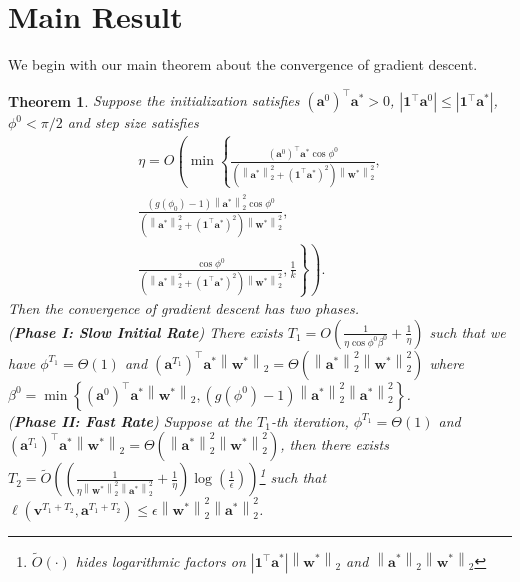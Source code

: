 \documentclass{article}
\newcommand{\firstlayer}{w}
\newcommand{\firstlayerWN}{v}
\newcommand{\secondlayer}{a}
\newcommand{\vect}[1]{\mathbf{#1}}
\newcommand{\norm}[1]{\left\|#1\right\|}
\newcommand{\abs}[1]{\left|#1\right|}
\newtheorem{thm}{Theorem}[section]
\begin{document}
\section{Main Result}
\label{sec:converge}
We begin with our main theorem about the convergence of gradient descent.
\begin{thm}\label{thm:w_norm_1_gd_converge}
Suppose the initialization satisfies $\left(\vect{\secondlayer}^0\right)^\top \vect{\secondlayer}^* > 0$, $\abs{ \vect{1}^\top\vect{\secondlayer}^0}\le \abs{\vect{1}^\top \vect{\secondlayer}^*}$, $\phi^0 <\pi/2$ and
step size satisfies \begin{align*}
\eta = O\left( \min\left\{\frac{\left(\vect{\secondlayer}^0\right)^\top \vect{\secondlayer}^*\cos \phi^0}{\left(\norm{\vect{\secondlayer}^*}_2^2+\left(\vect{1}^\top\vect{\secondlayer}^*\right)^2\right)\norm{\vect{\firstlayer}^*}_2^2},\right.\right.\\
\left.\left.\frac{\left(g(\phi_0)-1\right)\norm{\vect{\secondlayer}^*}_2^2\cos \phi^0}{\left(\norm{\vect{\secondlayer}^*}_2^2+\left(\vect{1}^\top\vect{\secondlayer}^*\right)^2\right)\norm{\vect{\firstlayer}^*}_2^2},\right.\right.\\
\left.\left.\frac{\cos \phi^0}{\left(\norm{\vect{\secondlayer}^*}_2^2+\left(\vect{1}^\top\vect{\secondlayer}^*\right)^2\right)\norm{\vect{\firstlayer}^*}_2^2},
\frac{1}{k}\right\}\right).
\end{align*}
Then the convergence of gradient descent has two phases.\\
(\textbf{Phase I: Slow Initial Rate})
There exists $T_1 = O\left(\frac{1}{\eta\cos\phi^0\beta^0}+ \frac{1}{\eta}\right)$ such that  we have
$\phi^{T_1} = \Theta\left(1\right)$ and $\left(\vect{\secondlayer}^{T_1}\right)^\top \vect{\secondlayer}^*\norm{\vect{\firstlayer}^*}_2 = \Theta\left(\norm{\vect{\secondlayer}^*}_2^2\norm{\vect{\firstlayer}^*}_2^2\right)$ where $\beta^0 = \min\left\{\left(\vect{\secondlayer}^0\right)^\top \vect{\secondlayer}^*\norm{\vect{\firstlayer}^*}_2, (g(\phi^0)-1)\norm{\vect{\secondlayer}^*}_2^2\norm{\vect{\secondlayer}^*}_2^2\right\}$. \\
(\textbf{Phase II: Fast Rate})
Suppose at the $T_1$-th iteration, $\phi^{T_1} = \Theta\left(1\right)$ and $\left(\vect{\secondlayer}^{T_1}\right)^\top \vect{\secondlayer}^*\norm{\vect{\firstlayer}^*}_2 = \Theta\left(\norm{\vect{\secondlayer}^*}_2^2\norm{\vect{\firstlayer}^*}_2^2\right)$, then there exists $T_2 = \widetilde{O}(\left(\frac{1}{\eta\norm{\vect{\firstlayer}^*}_2^2\norm{\vect{\secondlayer}^*}_2^2 } + \frac{1}{\eta}\right)\log\left(\frac{1}{\epsilon}\right))$\footnote{$\widetilde{O}\left(\cdot\right)$ hides logarithmic factors on $\abs{\vect{1}^\top\vect{\secondlayer}^*}\norm{\vect{\firstlayer}^*}_2$ and $\norm{\vect{\secondlayer}^*}_2\norm{\vect{\firstlayer}^*}_2$} such that $\ell\left(\vect{\firstlayerWN}^{T_1+T_2},\vect{\secondlayer}^{T_1+T_2}\right) \le \epsilon\norm{\vect{\firstlayer}^*}_2^2\norm{\vect{\secondlayer}^*}_2^2$.
\end{thm}
\end{document}
